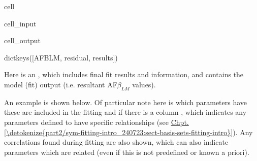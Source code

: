 \documentclass[letterpaper,table,10pt,english]{jupyterBook}
\begin{document}
\begin{sphinxuseclass}{cell}\begin{sphinxVerbatimInput}

\begin{sphinxuseclass}{cell_input}
\begin{sphinxVerbatim}[commandchars=\\\{\}]
  
\PYG{p}{[}\PYG{p}{]}
\end{sphinxVerbatim}

\end{sphinxuseclass}\end{sphinxVerbatimInput}
\begin{sphinxVerbatimOutput}

\begin{sphinxuseclass}{cell_output}
\begin{sphinxVerbatim}[commandchars=\\\{\}]
dict\PYGZus{}keys([\PYGZsq{}AFBLM\PYGZsq{}, \PYGZsq{}residual\PYGZsq{}, \PYGZsq{}results\PYGZsq{}])
\end{sphinxVerbatim}

\end{sphinxuseclass}\end{sphinxVerbatimOutput}

\end{sphinxuseclass}
\sphinxAtStartPar
Here  is an , which includes final fit results and information, and  contains the model (fit) output (i.e. resultant AF\sphinxhyphen{}\(\beta_{LM}\) values).

\sphinxAtStartPar
An example is shown below. Of particular note here is which parameters have  \sphinxhyphen{} these are included in the fitting \sphinxhyphen{} and if there is a column , which indicates any parameters defined to have specific relationships (see \hyperref[\detokenize{part2/sym-fitting-intro_240723:sect-basis-sets-fitting-intro}]{Chpt.\@ \ref{\detokenize{part2/sym-fitting-intro_240723:sect-basis-sets-fitting-intro}}}). Any correlations found during fitting are also shown, which can also indicate parameters which are related (even if this is not predefined or known a priori).
\end{document}

